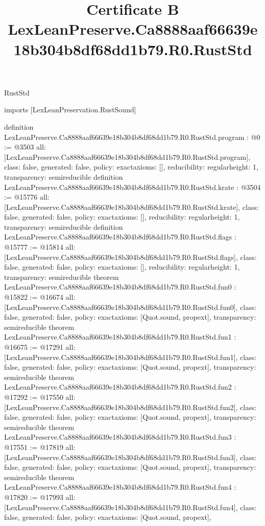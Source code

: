 \begin{lexlean}{RustStd}
\title{Certificate B LexLeanPreserve.Ca8888aaf66639e18b304b8df68dd1b79.R0.RustStd}
\begin{coremodule}
imports [LexLeanPreservation.RustSound]

definition LexLeanPreserve.Ca8888aaf66639e18b304b8df68dd1b79.R0.RustStd.program : @0 := @3503 {
  all: [LexLeanPreserve.Ca8888aaf66639e18b304b8df68dd1b79.R0.RustStd.program],
  class: false,
  generated: false,
  policy: exact{axioms: []},
  reducibility: regular{height: 1},
  transparency: semireducible
}
definition LexLeanPreserve.Ca8888aaf66639e18b304b8df68dd1b79.R0.RustStd.krate : @3504 := @15776 {
  all: [LexLeanPreserve.Ca8888aaf66639e18b304b8df68dd1b79.R0.RustStd.krate],
  class: false,
  generated: false,
  policy: exact{axioms: []},
  reducibility: regular{height: 1},
  transparency: semireducible
}
definition LexLeanPreserve.Ca8888aaf66639e18b304b8df68dd1b79.R0.RustStd.flags : @15777 := @15814 {
  all: [LexLeanPreserve.Ca8888aaf66639e18b304b8df68dd1b79.R0.RustStd.flags],
  class: false,
  generated: false,
  policy: exact{axioms: []},
  reducibility: regular{height: 1},
  transparency: semireducible
}
theorem LexLeanPreserve.Ca8888aaf66639e18b304b8df68dd1b79.R0.RustStd.fun0 : @15822 := @16674 {
  all: [LexLeanPreserve.Ca8888aaf66639e18b304b8df68dd1b79.R0.RustStd.fun0],
  class: false,
  generated: false,
  policy: exact{axioms: [Quot.sound, propext]},
  transparency: semireducible
}
theorem LexLeanPreserve.Ca8888aaf66639e18b304b8df68dd1b79.R0.RustStd.fun1 : @16675 := @17291 {
  all: [LexLeanPreserve.Ca8888aaf66639e18b304b8df68dd1b79.R0.RustStd.fun1],
  class: false,
  generated: false,
  policy: exact{axioms: [Quot.sound, propext]},
  transparency: semireducible
}
theorem LexLeanPreserve.Ca8888aaf66639e18b304b8df68dd1b79.R0.RustStd.fun2 : @17292 := @17550 {
  all: [LexLeanPreserve.Ca8888aaf66639e18b304b8df68dd1b79.R0.RustStd.fun2],
  class: false,
  generated: false,
  policy: exact{axioms: [Quot.sound, propext]},
  transparency: semireducible
}
theorem LexLeanPreserve.Ca8888aaf66639e18b304b8df68dd1b79.R0.RustStd.fun3 : @17551 := @17819 {
  all: [LexLeanPreserve.Ca8888aaf66639e18b304b8df68dd1b79.R0.RustStd.fun3],
  class: false,
  generated: false,
  policy: exact{axioms: [Quot.sound, propext]},
  transparency: semireducible
}
theorem LexLeanPreserve.Ca8888aaf66639e18b304b8df68dd1b79.R0.RustStd.fun4 : @17820 := @17993 {
  all: [LexLeanPreserve.Ca8888aaf66639e18b304b8df68dd1b79.R0.RustStd.fun4],
  class: false,
  generated: false,
  policy: exact{axioms: [Quot.sound, propext]},
}
\end{coremodule}
\end{lexlean}
